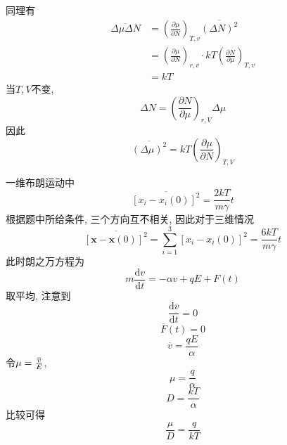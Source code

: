 \documentclass[UTF8,9pt]{ctexart}
\begin{document}
  同理有$$ 
\begin{aligned} \overline{\Delta \mu \Delta N} &=\left(\frac{\partial \mu}{\partial N}\right)_{T, v} \overline{(\Delta N)^{2}} \\ &=\left(\frac{\partial \mu}{\partial N}\right)_{r, v} \cdot k T\left(\frac{\partial N}{\partial \mu}\right)_{T, v} \\ &=k T \end{aligned}
 $$
 当$T,V$不变,$$ 
 \Delta N=\left(\frac{\partial N}{\partial \mu}\right)_{r, V} \Delta \mu
  $$
  因此$$ 
  \overline{(\Delta \mu)^{2}}=k T\left(\frac{\partial \mu}{\partial N}\right)_{T, V}
   $$

一维布朗运动中$$ 
\overline{\left[x_{i}-x_{i}(0)\right]^{2}}=\frac{2 k T}{m \gamma} t
 $$
 根据题中所给条件, 三个方向互不相关, 因此对于三维情况
 $$ 
\overline{[\bm{x}-\bm{x}(0)]^{2}}=\sum_{i=1}^{3}\left[x_{i}-x_{i}(0)\right]^{2}=\frac{6 k T}{m \gamma} t
 $$
此时朗之万方程为$$ 
m \frac{\mathrm{d} v}{\mathrm{d} t}=-\alpha v+q E+F(t)
 $$
 取平均, 注意到$$ 
 \frac{\mathrm{d} \overline{v}}{\mathrm{d} t}=0
  $$$$ 
  \overline{F}(t)=0
   $$$$ 
   \overline{v}=\frac{q E}{\alpha}
    $$令$\mu=\frac{\overline{v}}{E}$, 
    $$ 
\mu=\frac{q}{\alpha}
 $$$$ 
 D=\frac{k T}{\alpha}
  $$比较可得$$ 
  \frac{\mu}{D}=\frac{q}{k T}
   $$
   
\end{document}
